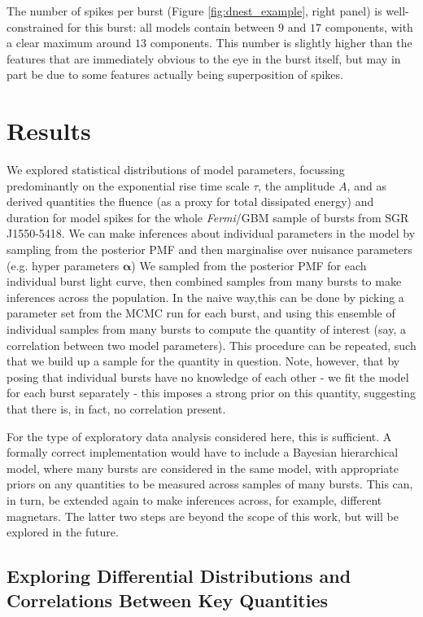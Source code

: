 \documentclass[12pt]{emulateapj}
\begin{document}
The number of spikes per burst (Figure \ref{fig:dnest_example}, right panel) is well-constrained for this burst: all models contain between $9$ and $17$ components, with a 
clear maximum around $13$ components. This number is slightly higher than the features that are immediately obvious to the eye 
in the burst itself, but may in part be due to some features actually being superposition of spikes. 


\section{Results}
\label{sec:results}
We explored statistical distributions of model parameters, focussing predominantly on the exponential rise time scale $\tau$, 
the amplitude $A$, and as derived quantities the fluence (as a proxy for total dissipated energy) and duration for model spikes for
 the whole {\it Fermi}/GBM sample of bursts from SGR J1550-5418. We can make inferences about individual parameters in the model by sampling
 from the posterior PMF and then marginalise over nuisance parameters (e.g. 
hyper parameters $\bm{\alpha}$) We sampled from the posterior PMF for each individual burst light curve, then combined
 samples from many bursts to make inferences across the population.
 In the naive way,this can be done by picking a parameter set from the MCMC run for each burst, and using this ensemble of individual samples from many bursts 
to compute the quantity of interest (say, a correlation between two model parameters). This procedure can be repeated, such that we build up a sample
for the quantity in question. Note, however, that by posing that individual bursts have no knowledge of each other - we fit the model for each burst separately - 
this imposes a strong prior on this quantity, suggesting that there is, in fact, no correlation present. 

For the type of exploratory data analysis considered here, this is sufficient. A formally correct implementation would have to include a Bayesian hierarchical model,
where many bursts are considered in the same model, with appropriate priors on any quantities to be measured across samples of many bursts. This can, in turn,
be extended again to make inferences across, for example, different magnetars. The latter two steps are beyond the scope of this work, but will be explored in the future.




\subsection{Exploring Differential Distributions and Correlations Between Key Quantities}
\label{sec:exploration}
\end{document}
